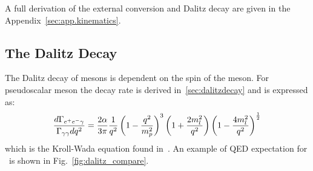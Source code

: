  A full derivation of the external conversion and Dalitz decay are given in the Appendix~\ref{sec:app.kinematics}.
 \FloatBarrier
  \subsection{The Dalitz Decay}
  The Dalitz decay of mesons is dependent on the spin of the meson. For pseudoscalar meson the decay rate is derived in~\ref{sec:dalitzdecay} and is expressed as:
  \begin{align}\label{eq:eegff.finalkroll_II}
  \frac{d\Gamma_{e^+e^- \gamma}}{\Gamma_{\gamma\gamma} dq^2} = \frac{2 \alpha}{3 \pi} \frac{1}{q^2} \left( 1- \frac{q^2}{m_p^2}\right)^3 \left( 1+ \frac{2m_l^2}{q^2}\right) \left( 1- \frac{4m_l^2}{q^2}\right)^{\frac{1}{2}} 
  \end{align}
  which is the Kroll-Wada equation found in~\cite{KrollWada,landsberg}.
  An example of QED expectation for \etaTP  \ is shown in Fig.~\ref{fig:dalitz_compare}.
